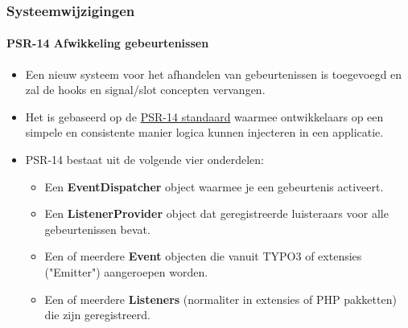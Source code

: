 \begin{frame}[fragile]
	\frametitle{Systeemwijzigingen}
	\framesubtitle{PSR-14 Afwikkeling gebeurtenissen}

	\begin{itemize}
		\item Een nieuw systeem voor het afhandelen van gebeurtenissen is toegevoegd en zal
			de hooks en signal/slot concepten vervangen.

		\item Het is gebaseerd op de \href{https://www.php-fig.org/psr/psr-14}{PSR-14 standaard}
			waarmee ontwikkelaars op een simpele en consistente manier logica kunnen injecteren in een applicatie.

		\item PSR-14 bestaat uit de volgende vier onderdelen:

			\begin{itemize}
				\item Een \textbf{EventDispatcher} object waarmee je een gebeurtenis activeert.
				\item Een \textbf{ListenerProvider} object dat geregistreerde luisteraars voor alle gebeurtenissen bevat.
				\item Een of meerdere \textbf{Event} objecten die vanuit TYPO3 of extensies ("Emitter") aangeroepen worden.
				\item Een of meerdere \textbf{Listeners} (normaliter in extensies of PHP pakketten) die zijn geregistreerd.
			\end{itemize}


	\end{itemize}

\end{frame}


